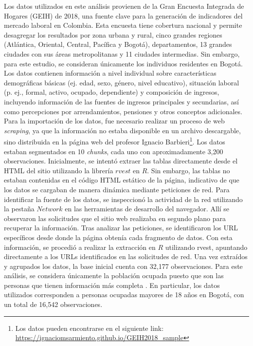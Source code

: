 \documentclass[12pt,a4paper,onecolumn]{article}
\begin{document}
Los datos utilizados en este análisis provienen de la Gran Encuesta Integrada de Hogares (GEIH) de 2018, una fuente clave para la generación de indicadores del mercado laboral en Colombia. Esta encuesta tiene cobertura nacional y permite desagregar los resultados por zona urbana y rural, cinco grandes regiones (Atlántica, Oriental, Central, Pacífica y Bogotá), departamentos, 13 grandes ciudades con sus áreas metropolitanas y 11 ciudades intermedias. Sin embargo, para este estudio, se consideran únicamente los individuos residentes en Bogotá. Los datos contienen información a nivel individual sobre características demográficas básicas (ej. edad, sexo, género, nivel educativo), situación laboral (p. ej., formal, activo, ocupado, dependiente) y composición de ingresos, incluyendo información de las fuentes de ingresos principales y secundarias, así como percepciones por arrendamientos, pensiones y otros conceptos adicionales.
\bigbreak
Para la importación de los datos, fue necesario realizar un proceso de web \textit{scraping}, ya que la información no estaba disponible en un archivo descargable, sino distribuida en la página web del profesor Ignacio Barbieri\footnote{Los datos pueden encontrarse en el siguiente link: \url{https://ignaciomsarmiento.github.io/GEIH2018_sample}}. Los datos estaban segmentados en 10 \textit{chunks}, cada uno con aproximadamente 3,200 observaciones. Inicialmente, se intentó extraer las tablas directamente desde el HTML del sitio utilizando la librería $rvest$ en $R$. Sin embargo, las tablas no estaban contenidas en el código HTML estático de la página, indicativo de que los datos se cargaban de manera dinámica mediante peticiones de red. Para identificar la fuente de los datos, se inspeccionó la actividad de la red utilizando la pestaña $Network$ en las herramientas de desarrollo del navegador. Allí se observaron las solicitudes que el sitio web realizaba en segundo plano para recuperar la información. Tras analizar las peticiones, se identificaron los URL específicos desde donde la página obtenía cada fragmento de datos. Con esta información, se procedió a realizar la extracción en $R$ utilizando rvest, apuntando directamente a los URLs identificados en las solicitudes de red. 
\bigbreak
Una vez extraídos y agrupados los datos, la base inicial cuenta con 32,177 observaciones. Para este análisis, se considera únicamente la población ocupada puesto que son las personas que tienen información más completa .  En particular, los datos utilizados corresponden a personas ocupadas mayores de 18 años en Bogotá, con un total de 16,542 observaciones. 
\end{document}
